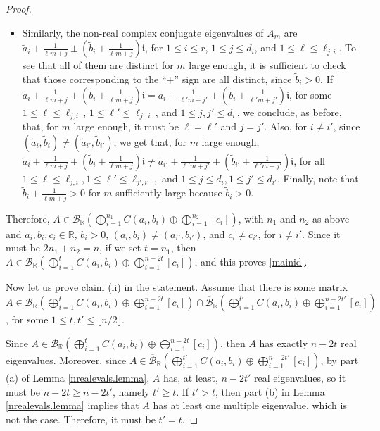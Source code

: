 \documentclass[a4paper]{article}
\newcommand{\R}{\mathbb R}
\newcommand{\ii}{\mathfrak i}
\newcommand{\bunr}{{\mathcal B}_{\R}}
\newcommand{\cbunr}{{\overline{\mathcal B}}_{\R}}
\begin{document}
\begin{proof}
\begin{itemize}
    \item Similarly, the non-real complex conjugate eigenvalues of $A_m$ are $\tilde a_i+\frac{1}{\ell m+j} \pm (\tilde b_i+\frac{1}{\ell m+j})\ii$, for $1\leq i\leq r$, $1\leq j\leq d_i$, and $1\leq \ell\leq\ell_{j,i}$. To see that all of them are distinct for $m$ large enough, it is sufficient to check that those corresponding to the ``$+$'' sign are all distinct, since $\widetilde b_i >0$. If $\tilde a_i+\frac{1}{\ell m+j}+ (\tilde b_i+\frac{1}{\ell m+j})\ii= \tilde a_{i}+\frac{1}{\ell'm+j'}+ (\tilde b_{i}+\frac{1}{\ell'm+j'})\ii$, for some $1\leq \ell \leq \ell_{j,i}\,$,  $1\leq \ell' \leq \ell_{j',i}\,$, and $1\leq j,j'\leq d_i\,$, we conclude, as before, that, for $m$ large enough, it must be $\ell=\ell'$ and $j=j'$. Also, for $i \ne i'$, since $(\tilde a_i, \tilde b_i )\neq (\tilde a_{i'}, \tilde b_{i'})$, we get that, for $m$ large enough, $\tilde a_i+\frac{1}{\ell m+j}+ (\tilde b_i+\frac{1}{\ell m+j})\ii\neq \tilde a_{i'}+\frac{1}{\ell'm+j'}+ (\tilde b_{i'}+\frac{1}{\ell'm+j'})\ii$, for all $1\leq \ell\leq\ell_{j,i},1\leq\ell'\leq \ell_{j',i'}\,,$ and $1\leq j\leq d_i,1\leq j'\leq d_{i'}$. Finally, note that $\tilde b_i+\frac{1}{\ell m+j} > 0$ for $m$ sufficiently large because $\tilde b_i > 0$.
\end{itemize}
Therefore, $A\in \cbunr \left(\bigoplus_{i=1}^{n_1}C(a_i,b_i)\oplus \bigoplus_{i=1}^{n_2}[c_i]\right)$, with $n_1$ and $n_2$ as above and $a_i,b_i,c_i\in\R$, $b_i >0$, $(a_i,b_i) \neq (a_{i'}, b_{i'})$, and $c_i\neq c_{i'}$, for $i\neq i'$. Since it must be $2n_1+n_2=n$, if we set $t=n_1$, then $A\in \cbunr \left(\bigoplus_{i=1}^tC(a_i,b_i)\oplus\bigoplus_{i=1}^{n-2t}[c_i]\right)$, and this proves \eqref{mainid}.

Now let us prove claim (ii) in the statement. Assume that there is some matrix $A\in\bunr \left(\bigoplus_{i=1}^tC(a_i,b_i)\oplus\bigoplus_{i=1}^{n-2t}[c_i]\right)\cap\cbunr \left(\bigoplus_{i=1}^{t'}C(a_i,b_i)\oplus\bigoplus_{i=1}^{n-2t'}[c_i]\right)$, for some $1\leq t,t'\leq\lfloor n/2\rfloor$.

Since $A\in\bunr \left(\bigoplus_{i=1}^tC(a_i,b_i)\oplus\bigoplus_{i=1}^{n-2t}[c_i]\right)$, then $A$ has exactly $n-2t$ real eigenvalues. Moreover, since $A\in\cbunr \left(\bigoplus_{i=1}^{t'}C(a_i,b_i)\oplus\bigoplus_{i=1}^{n-2t'}[c_i]\right)$, %
by part (a) of Lemma \ref{nrealevals.lemma}, $A$ has, at least, $n-2t'$ real eigenvalues, so it must be $n-2t\geq n-2t'$, namely $t'\geq t$. If $t'>t$, then part (b) in Lemma \ref{nrealevals.lemma} implies that $A$ has at least one multiple eigenvalue, which is not the case. Therefore, it must be $t'=t$.



\end{proof}
\end{document}

